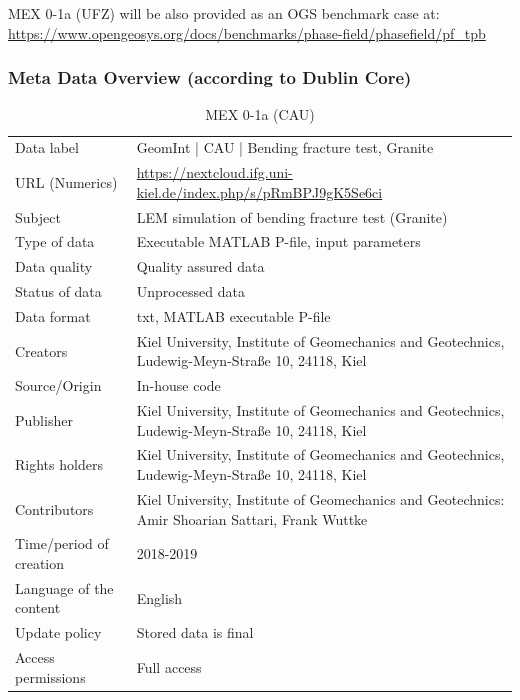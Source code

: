 MEX 0-1a (UFZ) will be also provided as an OGS benchmark case at:\\
\small
\url{https://www.opengeosys.org/docs/benchmarks/phase-field/phasefield/pf_tpb}
\normalsize

\clearpage
\subsubsection*{Meta Data Overview (according to Dublin Core)}
\begin{table}[!ht]
\caption{MEX 0-1a (CAU)}
\label{tab:dms-mex0-1a-cau}
\small
\begin{tabular}{R{3.5cm}|L{7.5cm}}
\hline
%
Data label & GeomInt | CAU | Bending fracture test, Granite \\
URL (Numerics) &  \url{https://nextcloud.ifg.uni-kiel.de/index.php/s/pRmBPJ9gK5Se6ci} \\
Subject  &  LEM simulation of bending fracture test (Granite)\\
Type of data  &  Executable MATLAB P-file, input parameters\\
Data quality  &  Quality assured data \\
Status of data  &  Unprocessed data\\
Data format  & txt, MATLAB executable P-file\\
Creators  &  Kiel University, Institute of Geomechanics and Geotechnics, Ludewig-Meyn-Stra\ss e 10, 24118, Kiel\\
Source/Origin & In-house code \\
Publisher  &  Kiel University, Institute of Geomechanics and Geotechnics, Ludewig-Meyn-Stra\ss e 10, 24118, Kiel \\
Rights holders &  Kiel University, Institute of Geomechanics and Geotechnics, Ludewig-Meyn-Stra\ss e 10, 24118, Kiel \\
Contributors &   Kiel University, Institute of Geomechanics and Geotechnics: Amir Shoarian Sattari, Frank Wuttke\\
Time/period of creation &  2018-2019\\
Language of the content &  English\\
Update policy &  Stored data is final\\
Access permissions & Full access\\
%
\hline
\end{tabular}
\end{table}

